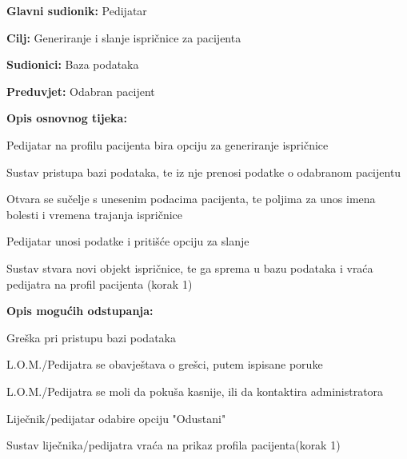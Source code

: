 					
					\noindent {}
					\begin{packed_item}
						
						\item \textbf{Glavni sudionik: }Pedijatar
						\item  \textbf{Cilj:} Generiranje i slanje ispričnice za pacijenta
						\item  \textbf{Sudionici:} Baza podataka
						\item  \textbf{Preduvjet:} Odabran pacijent
						\item  \textbf{Opis osnovnog tijeka:}
						
						\item[] \begin{packed_enum}
							
							\item Pedijatar na profilu pacijenta bira opciju za generiranje ispričnice
							\item Sustav pristupa bazi podataka, te iz nje prenosi podatke o odabranom pacijentu
							\item Otvara se sučelje s unesenim podacima pacijenta, te poljima za unos imena bolesti i vremena trajanja ispričnice
							\item Pedijatar unosi podatke i pritišće opciju za slanje
							\item Sustav stvara novi objekt ispričnice, te ga sprema u bazu podataka i vraća pedijatra na profil pacijenta (korak 1)
						\end{packed_enum}
						\item \textbf{Opis mogućih odstupanja:}
						\item[] \begin{packed_item}
						\item[2/5.a] Greška pri pristupu bazi podataka
						\item[] \begin{packed_enum}
							
							\item L.O.M./Pedijatra se obavještava o grešci, putem ispisane poruke
							\item L.O.M./Pedijatra se moli da pokuša kasnije, ili da kontaktira administratora
							
						\end{packed_enum}
							\item[4.a] Liječnik/pedijatar odabire opciju "Odustani"
							\item[] \begin{packed_enum}
								\item Sustav liječnika/pedijatra vraća na prikaz profila pacijenta(korak 1)
							\end{packed_enum}
						\end{packed_item}
					\end{packed_item}
					
